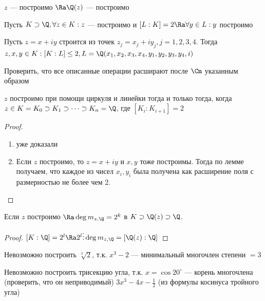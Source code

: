 \begin{corollary}
    \(z\) --- построимо \(\Ra \Q(z)\) --- построимо
\end{corollary}

\begin{corollary}
    Пусть \(K \supset \Q, \forall z \in K: z\) --- построимо и \([L:K] = 2 \Ra \forall y \in L: y\) построимо
\end{corollary}

\begin{lemma}
    Пусть \(z = x + iy\) строится из точек \(z_j = x_j + iy_j, j = 1, 2, 3, 4\). Тогда \(z, x, y \in K: [K:L] \le 2, L = \Q(x_1, x_2, x_3, x_4, y_1, y_2, y_3, y_4, i)\)
\end{lemma}
\begin{exercise}
    Проверить, что все описанные операции расширают после \(\Cm\) указанным образом
\end{exercise}

\begin{theorem}
    \(z\) построимо при помощи циркуля и линейки тогда и только тогда, когда \(z \in K = K_0 \supset K_1 \supset \dots \supset K_n = \Q\), где \([K_i:K_{i + 1}] = 2\)
\end{theorem}

\begin{proof}
    \begin{enumerate}
        \item[\(\La\)] уже доказали
        \item[\(\Ra\)] Если \(z\) построимо, то \(z = x + iy\) и \(x, y\) тоже построимы. Тогда по лемме получаем, что каждое из чисел \(x_i, y_i\) была получена как расширение поля с размерностью не более чем 2.
    \end{enumerate}
\end{proof}

\begin{corollary}
    Если \(z\) построимо \(\Ra \deg m_{z, \Q} = 2^k\) в \(K \supset \Q(z) \supset \Q\).
\end{corollary}
\begin{proof}
    \([K:\Q] = 2^l \Ra 2^l \vdots \deg m_{z, \Q} = [\Q(z):\Q]\)
\end{proof}

\begin{corollary}
    Невозможно построить \(\sqrt[3]{2}\), т.к. \(x^3 - 2\) --- минимальный многочлен степени \(= 3\)
\end{corollary}

\begin{corollary}
    Невозможно построить трисекцию угла, т.к. \(x = \cos 20^{\circ}\) --- корень многочлена (проверить, что он неприводимый) \(3x^3 - 4x - \frac{1}{2}\) (из формулы косинуса тройного угла)
\end{corollary}

